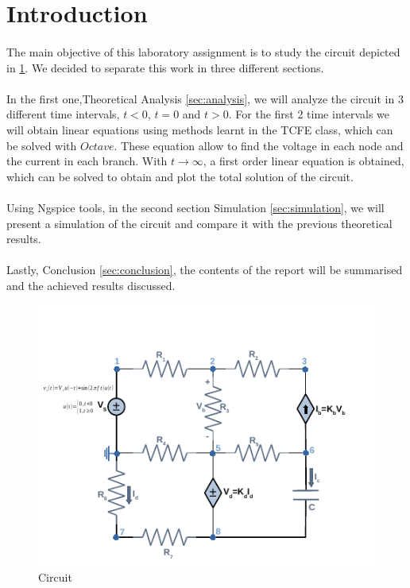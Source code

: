 \newpage
\section{Introduction}
\label{sec:introduction}

\paragraph{} The main objective of this laboratory assignment is to study the circuit depicted in \ref{fig:circuit}. We decided to
separate this work in three different sections. \paragraph{}
In the first one,Theoretical Analysis \ref{sec:analysis}, we will analyze the circuit in 3 different
time intervals, $t<0$, $t=0$ and $t>0$. For the first 2 time intervals we will obtain linear equations using methods learnt in the TCFE class,
which can be solved with $Octave$. These equation allow to find the voltage in each node and the current
in each branch. With $t \rightarrow \infty $, a first order linear equation is obtained, which can be solved to obtain and plot the total solution of
the circuit. \paragraph{}
Using Ngspice tools, in the second section Simulation \ref{sec:simulation}, we will present a simulation of the circuit
and compare it with the previous theoretical results. \paragraph{}
Lastly, Conclusion \ref{sec:conclusion}, the contents of the report will be summarised and the achieved results discussed.

\begin{figure}[h]
    \centering
    \includegraphics[width=0.8\linewidth]{circuit.pdf}
    \caption{Circuit}
    \label{fig:circuit}
\end{figure}

